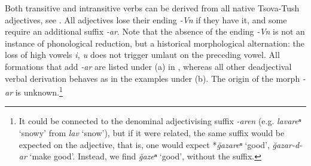 Both transitive and intransitive verbs can be derived from all native Tsova-Tush adjectives, see . All adjectives lose their ending \textit{-Vn} if they have it, and some require an additional suffix \textit{-ar}. Note that the absence of the ending \textit{-Vn} is not an instance of phonological reduction, but a historical morphological alternation: the loss of high vowels \textit{i, u} does not trigger umlaut on the preceding vowel. All formations that add \textit{-ar} are listed under (a) in , whereas all other deadjectival verbal derivation behaves as in the examples under (b). The origin of the morph \textit{-ar} is unknown.\footnote{It could be connected to the denominal adjectivising suffix \textit{-aren} (e.g. \textit{lavareⁿ} `snowy' from \textit{lav} `snow'), but if it were related, the same suffix would be expected on the adjective, that is, one would expect *\textit{\u{g}azareⁿ} `good', \textit{\u{g}azar-d-ar} `make good'. Instead, we find \textit{\u{g}azeⁿ} `good', without the suffix.}

